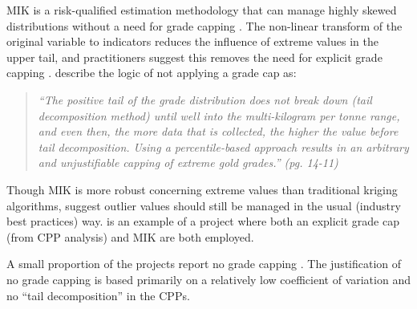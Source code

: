 

\Gls{MIK} is a risk-qualified estimation methodology that can manage highly skewed distributions without a need for grade capping \citep{journel1983nonparametric}. The non-linear transform of the original variable to indicators reduces the influence of extreme values in the upper tail, and practitioners suggest this removes the need for explicit grade capping \citep{pretium2020, ngm2020, tristar2021, cardinal2019}. \cite{pretium2020} describe the logic of not applying a grade cap as:

\blockquote{\textit{``The positive tail of the grade distribution does
        not break down (tail decomposition method) until well into the multi-kilogram per tonne range, and even then, the more data that is collected, the higher the value before tail decomposition. Using a percentile-based approach results in an arbitrary and unjustifiable capping of extreme gold grades.'' (pg. 14-11)}}

Though \gls{MIK} is more robust concerning extreme values than traditional kriging algorithms, \cite{carvalho2017overview} suggest outlier values should still be managed in the usual (industry best practices) way. \cite{artemis2020} is an example of a project where both an explicit grade cap (from \gls{CPP} analysis) and \gls{MIK} are both employed.

A small proportion of the projects report no grade capping \citep{medgold2021,pasofino2020,eldorado2020}. The justification of no grade capping is based primarily on a relatively low coefficient of variation and no ``tail decomposition'' in the \glspl{CPP}.


